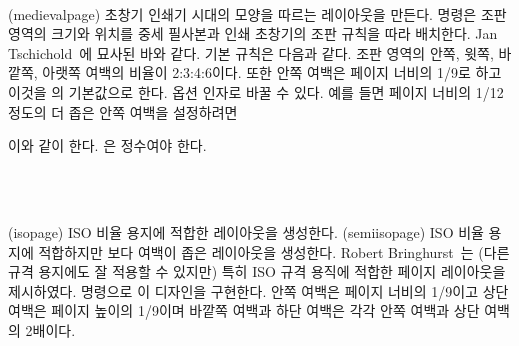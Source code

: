 \begin{syntax}
\cmd{\medievalpage} \\
\end{syntax}
\glossary(medievalpage)%
  {}%
  {초창기 인쇄기 시대의 모양을 따르는 레이아웃을 만든다.}
\cmd{\medievalpage} 명령은 조판 영역의 크기와 위치를 중세 필사본과 인쇄 초창기의 조판 규칙을 따라 배치한다. Jan Tschichold~\cite{TSCHICHOLD91}에 묘사된 바와 같다.
기본 규칙은 다음과 같다. 조판 영역의 안쪽, 윗쪽, 바깥쪽, 아랫쪽 여백의
비율이 2:3:4:6이다. 또한 안쪽 여백은 페이지 너비의 1/9로 하고 이것을 \cmd{\medievalpage}의 기본값으로 한다.  옵션 인자로 
바꿀 수 있다. 예를 들면 페이지 너비의 1/12 정도의 더 좁은 안쪽 여백을
설정하려면 
\begin{lcode}
\medievalpage[12]
\end{lcode}
이와 같이 한다. 은 정수여야 한다.

\begin{syntax}
\cmd{\isopage} \\
\cmd{\semiisopage} \\
\end{syntax}
\glossary(isopage)%
  {}%
  {ISO 비율 용지에 적합한 레이아웃을 생성한다.}
\glossary(semiisopage)%
  {}%
  {ISO 비율 용지에 적합하지만 보다 여백이 좁은 레이아웃을 생성한다.}
Robert Bringhurst~\cite{BRINGHURST99}는 (다른 규격 용지에도 잘 적용할 수 있지만) 특히 ISO 규격 용직에 적합한
페이지 레이아웃을 제시하였다. \cmd{\isopage} 명령으로 이 디자인을 구현한다.
안쪽 여백은 페이지 너비의 1/9이고 상단 여백은 페이지 높이의 1/9이며 
바깥쪽 여백과 하단 여백은 각각 안쪽 여백과 상단 여백의 2배이다.

